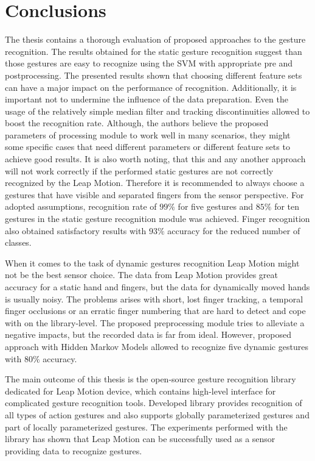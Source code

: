 \chapter{Conclusions}

The thesis contains a thorough evaluation of proposed approaches to the gesture recognition.
The results obtained for the static gesture recognition suggest than those gestures are easy to recognize using the SVM with appropriate pre and postprocessing.
The presented results shown that choosing different feature sets can have a major impact on the performance of recognition.
Additionally, it is important not to undermine the influence of the data preparation. 
Even the usage of the relatively simple median filter and tracking discontinuities allowed to boost the recognition rate.
Although, the authors believe the proposed parameters of processing module to work well in many scenarios, they might some specific cases that need different parameters or different feature sets to achieve good results.
It is also worth noting, that this and any another approach will not work correctly if the performed static gestures are not correctly recognized by the Leap Motion.
Therefore it is recommended to always choose a gestures that have visible and separated fingers from the sensor perspective.
For adopted assumptions, recognition rate of $99\%$ for five gestures and $85\%$ for ten gestures in the static gesture recognition module was achieved. Finger recognition also obtained satisfactory results with $93\%$ accuracy for the reduced number of classes.

When it comes to the task of dynamic gestures recognition Leap Motion might not be the best sensor choice.
The data from Leap Motion provides great accuracy for a static hand and fingers, but the data for dynamically moved hands is usually noisy.
The problems arises with short, lost finger tracking, a temporal finger occlusions or an erratic finger numbering that are hard to detect and cope with on the library-level.
The proposed preprocessing module tries to alleviate a negative impacts, but the recorded data is far from ideal.
However, proposed approach with Hidden Markov Models allowed to recognize five dynamic gestures with $80\%$ accuracy.

The main outcome of this thesis is the open-source gesture recognition library dedicated for Leap Motion device, which contains high-level interface for complicated gesture recognition tools. 
Developed library provides recognition of all types of action gestures and also supports globally parameterized gestures and part of locally parameterized gestures.
The experiments performed with the library has shown that Leap Motion can be successfully used as a sensor providing data to recognize gestures.



